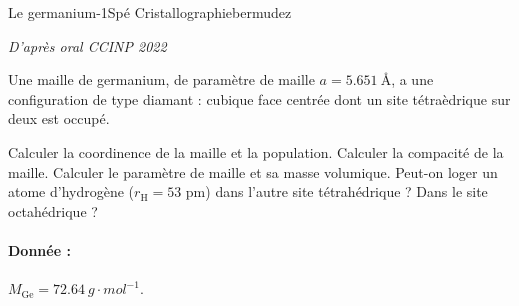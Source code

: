 \begin{exercise}{Le germanium}{-1}{Spé}
{Cristallographie}{bermudez}

\begin{flushright}
\noindent\textsl{D'après oral CCINP 2022}
\end{flushright}

Une maille de germanium, de paramètre de maille $a = \SI{5,651}{\angstrom}$, a une configuration de type diamant : cubique face centrée dont un site tétraèdrique sur deux est occupé.

\begin{questions}
    \question Calculer la coordinence de la maille et la population.
    \question Calculer la compacité de la maille.
    \question Calculer le paramètre de maille et sa masse volumique.
    \question Peut-on loger un atome d'hydrogène ($r_\text{H} = 53$ pm) dans l'autre site tétrahédrique ? Dans le site octahédrique ?
\end{questions}
   

\paragraph{Donnée :} $M_\text{Ge} = \SI{72,64}{g\cdot mol^{-1}}$.
\end{exercise}


